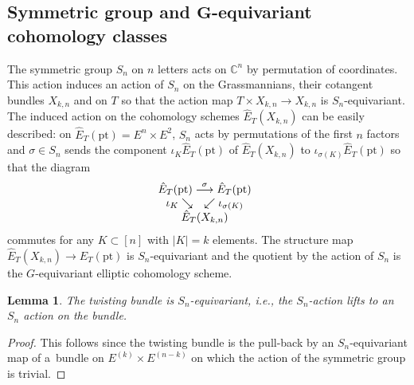 \documentclass[pdftex]{sigma}
\numberwithin{equation}{section}
\newtheorem{Lemma}[Theorem]{Lemma}
\begin{document}
\subsection[Symmetric group and $G$-equivariant cohomology classes]{Symmetric group and $\boldsymbol{G}$-equivariant cohomology classes}

The symmetric group $S_n$ on $n$ letters acts on $\mathbb C^n$ by permutation of coordinates. This action induces an action of $S_n$ on the Grassmannians, their cotangent bundles $X_{k,n}$ and on $T$ so that the action map
$T\times X_{k,n}\to X_{k,n}$ is $S_n$-equivariant. The induced action on the cohomology schemes $\hat E_T(X_{k,n})$ can be easily described: on $\hat E_T(\mathrm{pt})=E^n\times E^2$, $S_n$ acts by permutations of the first $n$ factors and $\sigma\in S_n$ sends the component $\iota_K\hat E_T(\mathrm{pt})$ of $\hat E_T(X_{k,n})$ to $\iota_{\sigma(K)}\hat E_T(\mathrm{pt})$ so that the diagram
\begin{gather*}
 \begin{array}{@{}c} \hat E_T(\mathrm{pt})
 \stackrel{\sigma}\longrightarrow \hat E_T(\mathrm{pt})\\
 \iota_K\searrow \quad\swarrow\iota_{\sigma(K)}\\ \hat E_T(X_{k,n})
 \end{array}
\end{gather*}
commutes for any $K\subset[n]$ with $|K|=k$ elements. The structure map $\hat E_T(X_{k,n})\to \hat E_T(\mathrm{pt})$ is $S_n$-equivariant and the quotient by the action of $S_n$ is the $G$-equivariant elliptic cohomology scheme.

\begin{Lemma}\label{lemma-8} The twisting bundle is $S_n$-equivariant, i.e., the $S_n$-action lifts to an $S_n$ action on the bundle.
\end{Lemma}
\begin{proof} This follows since the twisting bundle is the pull-back by an $S_n$-equivariant map of a~bundle on $E^{(k)}\times E^{(n-k)}$ on which the action of the symmetric group is trivial.
\end{proof}
\end{document}
